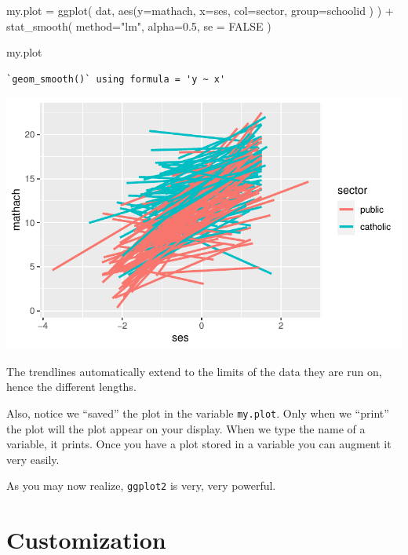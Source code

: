 \documentclass[
  letterpaper,
  DIV=11,
  numbers=noendperiod]{scrreprt}
\newenvironment{Shaded}{}{}
\newcommand{\AttributeTok}[1]{\textcolor[rgb]{0.49,0.56,0.16}{#1}}
\newcommand{\ConstantTok}[1]{\textcolor[rgb]{0.53,0.00,0.00}{#1}}
\newcommand{\FloatTok}[1]{\textcolor[rgb]{0.25,0.63,0.44}{#1}}
\newcommand{\FunctionTok}[1]{\textcolor[rgb]{0.02,0.16,0.49}{#1}}
\newcommand{\NormalTok}[1]{#1}
\newcommand{\OtherTok}[1]{\textcolor[rgb]{0.00,0.44,0.13}{#1}}
\newcommand{\SpecialCharTok}[1]{\textcolor[rgb]{0.25,0.44,0.63}{#1}}
\newcommand{\StringTok}[1]{\textcolor[rgb]{0.25,0.44,0.63}{#1}}
\begin{document}
\begin{Shaded}
\begin{Highlighting}[]
\NormalTok{my.plot }\OtherTok{=} \FunctionTok{ggplot}\NormalTok{( dat, }\FunctionTok{aes}\NormalTok{(}\AttributeTok{y=}\NormalTok{mathach, }\AttributeTok{x=}\NormalTok{ses, }\AttributeTok{col=}\NormalTok{sector, }\AttributeTok{group=}\NormalTok{schoolid ) ) }\SpecialCharTok{+} 
    \FunctionTok{stat\_smooth}\NormalTok{( }\AttributeTok{method=}\StringTok{"lm"}\NormalTok{, }\AttributeTok{alpha=}\FloatTok{0.5}\NormalTok{, }\AttributeTok{se =} \ConstantTok{FALSE}\NormalTok{ )}

\NormalTok{my.plot}
\end{Highlighting}
\end{Shaded}

\begin{verbatim}
`geom_smooth()` using formula = 'y ~ x'
\end{verbatim}

\includegraphics{intro_ggplot_files/figure-pdf/unnamed-chunk-6-1.pdf}

The trendlines automatically extend to the limits of the data they are
run on, hence the different lengths.

Also, notice we ``saved'' the plot in the variable \texttt{my.plot}.
Only when we ``print'' the plot will the plot appear on your display.
When we type the name of a variable, it prints. Once you have a plot
stored in a variable you can augment it very easily.

As you may now realize, \texttt{ggplot2} is very, very powerful.

\section{Customization}\label{customization}
\end{document}
